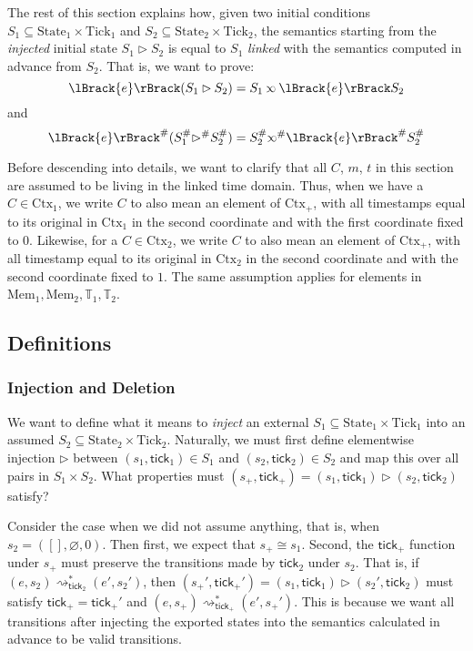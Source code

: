 \documentclass{article}
\theoremstyle{definition}
\newcommand*{\Abs}[1]{{#1}^{\#}}
\newcommand*{\Time}{\mathbb{T}}
\newcommand*{\Ctx}{\text{Ctx}}
\newcommand*{\Mem}{\text{Mem}}
\newcommand*{\mem}{m}
\newcommand*{\State}{\text{State}}
\newcommand*{\Tick}{\text{Tick}}
\newcommand*{\semarrow}{\rightsquigarrow}
\newcommand*{\semlink}{\mathbin{\rotatebox[origin=c]{180}{$\propto$}}}
\newcommand*{\sembracket}[1]{\lBrack{#1}\rBrack}
\newcommand*{\tick}{\mathsf{tick}}
\begin{document}
The rest of this section explains how, given two initial conditions $S_1\subseteq\State_1\times\Tick_1$ and $S_2\subseteq\State_2\times\Tick_2$, the semantics starting from the \emph{injected} initial state $S_1\rhd S_2$ is equal to $S_1$ \emph{linked} with the semantics computed in advance from $S_2$.
That is, we want to prove:
\[
  \sembracket{e}(S_1\rhd S_2)=S_1\semlink\sembracket{e}S_2
\]
and
\[
  \Abs{\sembracket{e}}(\Abs{S}_1\Abs\rhd \Abs{S}_2)=\Abs{S}_2\Abs\semlink\Abs{\sembracket{e}}\Abs{S}_2
\]

Before descending into details, we want to clarify that all $C$, $\mem$, $t$ in this section are assumed to be living in the linked time domain.
Thus, when we have a $C\in\Ctx_1$, we write $C$ to also mean an element of $\Ctx_+$, with all timestamps equal to its original in $\Ctx_1$ in the second coordinate and with the first coordinate fixed to $0$.
Likewise, for a $C\in\Ctx_2$, we write $C$ to also mean an element of $\Ctx_+$, with all timestamp equal to its original in $\Ctx_2$ in the second coordinate and with the second coordinate fixed to $1$.
The same assumption applies for elements in $\Mem_1,\Mem_2,\Time_1,\Time_2$.
\subsection{Definitions}
\subsubsection{Injection and Deletion}
We want to define what it means to \emph{inject} an external $S_1\subseteq\State_1\times\Tick_1$ into an assumed $S_2\subseteq\State_2\times\Tick_2$.
Naturally, we must first define elementwise injection $\rhd$ between $(s_1,\tick_1)\in S_1$ and $(s_2,\tick_2)\in S_2$ and map this over all pairs in $S_1\times S_2$.
What properties must $(s_+,\tick_+)=(s_1,\tick_1)\rhd(s_2,\tick_2)$ satisfy?

Consider the case when we did not assume anything, that is, when $s_2=([],\varnothing,0)$.
Then first, we expect that $s_+\cong s_1$.
Second, the $\tick_+$ function under $s_+$ must preserve the transitions made by $\tick_2$ under $s_2$.
That is, if $(e,s_2)\semarrow_{\tick_2}^*(e',s_2')$, then $(s_+',\tick_+')=(s_1,\tick_1)\rhd(s_2',\tick_2)$ must satisfy
$\tick_+=\tick_+'$ and $(e,s_+)\semarrow_{\tick_+}^*(e',s_+')$.
This is because we want all transitions after injecting the exported states into the semantics calculated in advance to be valid transitions.
\end{document}
